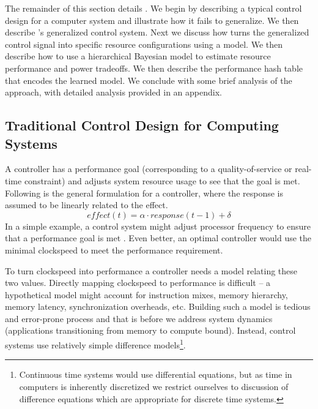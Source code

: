 The remainder of this section details \SYSTEM{}.  We begin by
describing a typical control design for a computer system and
illustrate how it fails to generalize.  We then describe \SYSTEM{}'s
generalized control system.  Next we discuss how \SYSTEM{} turns the
generalized control signal into specific resource configurations using
a model.  We then describe how to use a hierarchical Bayesian model to
estimate resource performance and power tradeoffs.  We then describe
the performance hash table that encodes the learned model. We conclude
with some brief analysis of the approach, with detailed analysis
provided in an appendix.


\subsection{Traditional Control Design for Computing Systems}
A controller has a performance goal (corresponding to a
quality-of-service or real-time constraint) and adjusts system resource
usage to see that the goal is met. Following is the general formulation for a controller, where the response is assumed to be linearly related to the effect.
\begin{equation}
  effect(t) = \alpha \cdot response(t-1) + \delta \label{eqn:clock}
\end{equation}
In a simple example, a control
system might adjust processor frequency to ensure that a performance
goal is met \cite{lefurgy}.  Even better, an optimal controller would
use the minimal clockspeed to meet the performance requirement.


To turn clockspeed into performance a controller needs a model
relating these two values.  Directly mapping clockspeed to performance
is difficult -- a hypothetical model might account for instruction
mixes, memory hierarchy, memory latency, synchronization overheads,
etc.  Building such a model is tedious and error-prone process and
that is before we address system dynamics (\eg applications
transitioning from memory to compute bound).  Instead, control systems
use relatively simple difference models\footnote{Continuous time
  systems would use differential equations, but as time in computers
  is inherently discretized we restrict ourselves to discussion of
  difference equations which are appropriate for discrete time
  systems.}.

